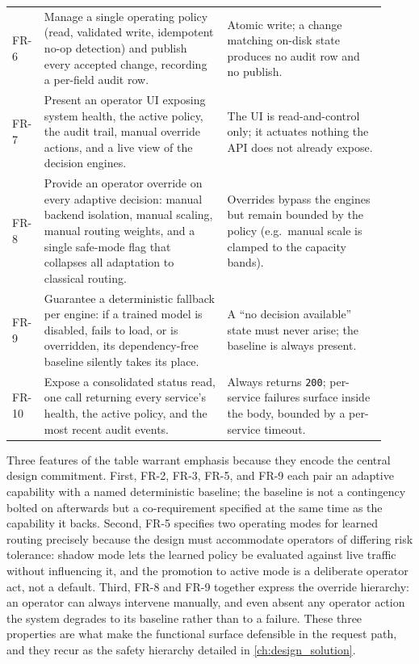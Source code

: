 \begin{table}[p]
\begin{tabular}{@{}p{0.06\linewidth}p{0.46\linewidth}p{0.40\linewidth}@{}}
FR-6 & Manage a single operating policy (read, validated write, idempotent no-op
detection) and publish every accepted change, recording a per-field audit row. &
Atomic write; a change matching on-disk state produces no audit row and no publish. \\
FR-7 & Present an operator UI exposing system health, the active policy, the audit
trail, manual override actions, and a live view of the decision engines. & The UI is
read-and-control only; it actuates nothing the API does not already expose. \\
FR-8 & Provide an operator override on every adaptive decision: manual backend
isolation, manual scaling, manual routing weights, and a single safe-mode flag that
collapses all adaptation to classical routing. & Overrides bypass the engines but
remain bounded by the policy (e.g.\ manual scale is clamped to the capacity bands). \\
FR-9 & Guarantee a deterministic fallback per engine: if a trained model is disabled,
fails to load, or is overridden, its dependency-free baseline silently takes its
place. & A ``no decision available'' state must never arise; the baseline is always
present. \\
FR-10 & Expose a consolidated status read, one call returning every service's
health, the active policy, and the most recent audit events. & Always returns
\texttt{200}; per-service failures surface inside the body, bounded by a per-service
timeout. \\
\bottomrule
\end{tabular}
\end{table}

Three features of the table warrant emphasis because they encode the central design
commitment. First, FR-2, FR-3, FR-5, and FR-9 each pair an adaptive capability with a
named deterministic baseline; the baseline is not a contingency bolted on afterwards
but a co-requirement specified at the same time as the capability it backs. Second,
FR-5 specifies two operating modes for learned routing precisely because the design
must accommodate operators of differing risk tolerance: shadow mode lets the learned
policy be evaluated against live traffic without influencing it, and the promotion to
active mode is a deliberate operator act, not a default. Third, FR-8 and FR-9 together
express the override hierarchy: an operator can always intervene manually, and even
absent any operator action the system degrades to its baseline rather than to a
failure. These three properties are what make the functional surface defensible in
the request path, and they recur as the safety hierarchy detailed in
\cref{ch:design_solution}.

